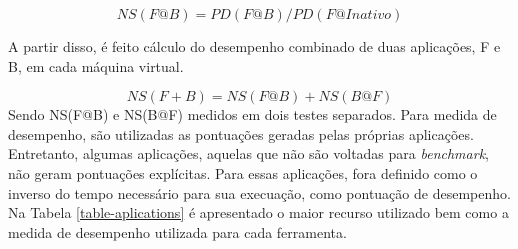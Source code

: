 \documentclass[[10pt,journal]{IEEEtran}
\begin{document}
\begin{equation}
\label{eq:degradation}
NS(F@B) = PD(F@B)/PD(F@Inativo)
\end{equation}

A partir disso, é feito cálculo do desempenho combinado de duas aplicações, F e B, em cada máquina virtual.

\begin{equation}
\label{eq:combined}
NS ( F + B ) = NS ( F @ B ) + NS ( B @ F )
\end{equation}
Sendo NS(F@B) e  NS(B@F) medidos em dois testes separados. Para medida de desempenho, são utilizadas as pontuações geradas pelas próprias aplicações. Entretanto, algumas aplicações, aquelas que não são voltadas para \textit{benchmark}, não geram pontuações explícitas. Para essas aplicações, fora definido como o inverso do tempo necessário para sua execuação, como pontuação de desempenho. Na Tabela \ref{table-aplications} é apresentado o maior recurso utilizado bem como a medida de desempenho utilizada para cada ferramenta.
\end{document}
